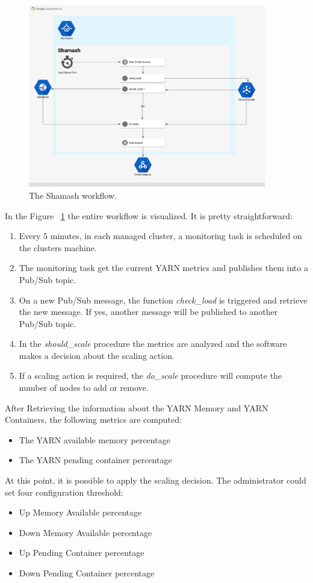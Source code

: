 \documentclass[12pt,twoside,cucitura]{toptesi}
\begin{document}
\begin{figure}
\centering
\includegraphics[height=80mm]{shamash}
\caption{The Shamash workflow.}\label{fig:shamash}
\end{figure}

In the Figure ~\ref{fig:shamash} the entire workflow is visualized. It is pretty straightforward:
\begin{enumerate}
	\item Every 5 minutes, in each managed cluster, a monitoring task is scheduled on the clusters machine.
	\item The monitoring task get the current YARN metrics and publishes them into a Pub/Sub topic.
	\item On a new Pub/Sub message, the function\textit{ check\_load} is triggered and retrieve the new message. If yes, another message will be published to another Pub/Sub topic.
	\item In the \textit{should\_scale} procedure the metrics are analyzed and the software makes a decision about the scaling action. 
	\item If a scaling action is required, the \textit{do\_scale} procedure will compute the number of nodes to add or remove.
\end{enumerate}

After Retrieving the information about the YARN Memory and YARN Containers, the following metrics are computed:
\begin{itemize}
	\item The YARN available memory percentage
	\item The YARN pending container percentage
\end{itemize}
At this point, it is possible to apply the scaling decision. The administrator could set four configuration threshold:
\begin{itemize}
	\item Up Memory Available percentage
	\item Down Memory Available percentage
	\item Up Pending Container percentage
	\item Down Pending Container percentage
\end{itemize}
\end{document}
